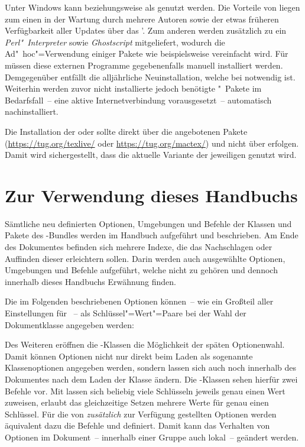 %
Unter Windows kann \TeXLive beziehungsweise \MiKTeX als \DistributionGeneral 
genutzt werden. Die Vorteile von \TeXLive liegen zum einen in der Wartung durch 
mehrere Autoren sowie der etwas früheren Verfügbarkeit aller Updates über das 
\CTAN'. Zum anderen werden zusätzlich zu  ein 
\emph{Perl"~Interpreter} sowie \emph{Ghostscript} mitgeliefert, wodurch die 
Ad"~hoc"=Verwendung einiger Pakete wie beispielsweise  
vereinfacht wird. Für \MiKTeX müssen diese externen Programme gegebenenfalls 
manuell installiert werden. Demgegenüber entfällt die alljährliche 
Neuinstallation, welche bei \TeXLive notwendig ist. Weiterhin werden zuvor 
nicht installierte jedoch benötigte "~Pakete im Bedarfsfall~-- 
eine aktive Internetverbindung vorausgesetzt~-- automatisch nachinstalliert.

%
Die Installation der \DistributionGeneral \TeXLive oder \MacTeX sollte direkt 
über die angebotenen Pakete (\url{https://tug.org/texlive/} oder 
\url{https://tug.org/mactex/}) und nicht über  erfolgen. 
Damit wird sichergestellt, dass die aktuelle Variante der jeweiligen 
\DistributionGeneral genutzt wird.



\section{%
  Zur Verwendung dieses Handbuchs%
}
%
Sämtliche neu definierten Optionen, Umgebungen und Befehle der Klassen und 
Pakete des \TUDScript-Bundles werden im Handbuch aufgeführt und beschrieben. Am 
Ende des Dokumentes befinden sich mehrere Indexe, die das Nachschlagen oder 
Auffinden dieser erleichtern sollen. Darin werden auch ausgewählte Optionen, 
Umgebungen und Befehle aufgeführt, welche nicht zu \TUDScript gehören und 
dennoch innerhalb dieses Handbuchs Erwähnung finden.

Die im Folgenden beschriebenen Optionen können~-- wie ein Großteil aller 
Einstellungen für \KOMAScript~-- als Schlüssel"=Wert"=Paare bei der Wahl der 
Dokumentklasse angegeben werden:

Des Weiteren eröffnen die \KOMAScript-Klassen die Möglichkeit der späten 
Optionenwahl. Damit können Optionen nicht nur direkt beim Laden als sogenannte 
Klassenoptionen angegeben werden, sondern lassen sich auch noch innerhalb des 
Dokumentes nach dem Laden der Klasse ändern. Die \KOMAScript-Klassen sehen 
hierfür zwei Befehle vor. Mit 
lassen sich beliebig viele Schlüsseln jeweils genau einen Wert zuweisen, 
 erlaubt das gleichzeitige 
Setzen mehrere Werte für genau einen Schlüssel. Für die von \TUDScript 
\emph{zusätzlich} zur Verfügung gestellten Optionen werden äquivalent dazu die 
Befehle  und 
 definiert. Damit kann das 
Verhalten von Optionen im Dokument~-- innerhalb einer Gruppe auch lokal~-- 
geändert werden.

